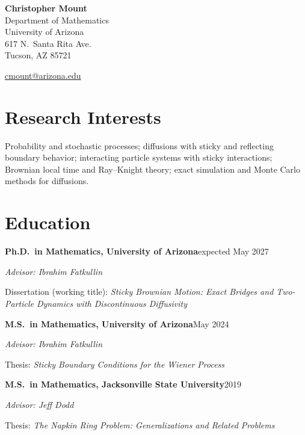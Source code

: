 \documentclass[11pt,letterpaper]{article}
\newcommand{\entry}[2]{\Needspace{4\baselineskip}\noindent\textbf{#1}\hfill #2\par}
\newcommand{\subentry}[1]{\noindent\textit{#1}\par}
\begin{document}
\begin{minipage}[t]{0.55\textwidth}
  {\LARGE\textbf{Christopher Mount}}\\[1.2ex]
  Department of Mathematics\\
  University of Arizona\\
  617 N.\ Santa Rita Ave.\\
  Tucson, AZ 85721
\end{minipage}%
\hfill
\begin{minipage}[t]{0.42\textwidth}
  \raggedleft
  \vspace{2.2em}
  \href{mailto:cmount@arizona.edu}{cmount@arizona.edu}\\
\end{minipage}

\section{Research Interests}
Probability and stochastic processes; diffusions with sticky and reflecting
boundary behavior; interacting particle systems with sticky interactions;
Brownian local time and Ray--Knight theory; exact simulation and Monte Carlo
methods for diffusions.

\section{Education}
\entry{Ph.D.\ in Mathematics, University of Arizona}{expected May 2027}
\subentry{Advisor: Ibrahim Fatkullin}
Dissertation (working title): \emph{Sticky Brownian Motion: Exact Bridges and
Two-Particle Dynamics with Discontinuous Diffusivity}

\medskip
\entry{M.S.\ in Mathematics, University of Arizona}{May 2024}
\subentry{Advisor: Ibrahim Fatkullin}
Thesis: \emph{Sticky Boundary Conditions for the Wiener Process}

\medskip
\entry{M.S.\ in Mathematics, Jacksonville State University}{2019}
\subentry{Advisor: Jeff Dodd}
Thesis: \emph{The Napkin Ring Problem: Generalizations and Related Problems}
\end{document}

